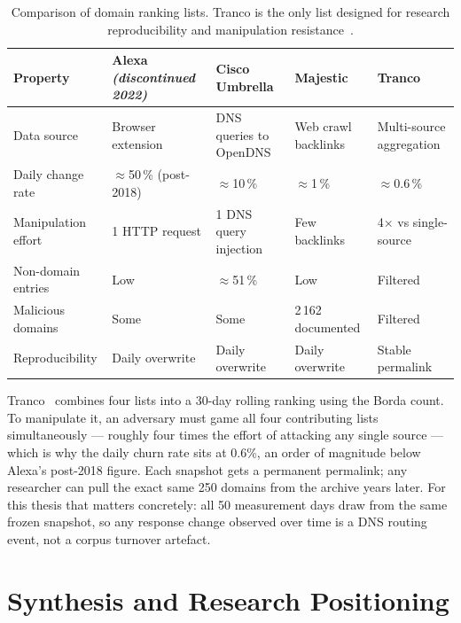 \begin{table}[tp]
\centering
\small
\begin{tabularx}{\linewidth}{p{2.2cm} X X X X}
\toprule
\textbf{Property} & \textbf{Alexa} \newline \textit{(discontinued 2022)} & \textbf{Cisco Umbrella} & \textbf{Majestic} & \textbf{Tranco} \\
\midrule
Data source  & Browser extension & \ac{DNS} queries to OpenDNS & Web crawl backlinks & Multi-source aggregation \\
Daily change rate & $\approx$50\,\% (post-2018) & $\approx$10\,\% & $\approx$1\,\% & $\approx$0.6\,\% \\
Manipulation effort & 1 \ac{HTTP} request & 1 \ac{DNS} query injection & Few backlinks & 4$\times$ vs single-source \\
Non-domain entries & Low & $\approx$51\,\% & Low & Filtered \\
Malicious domains & Some & Some & 2\,162 documented & Filtered \\
Reproducibility   & Daily overwrite & Daily overwrite & Daily overwrite & Stable permalink \\
\bottomrule
\end{tabularx}
\caption{Comparison of domain ranking lists. Tranco is the only list designed for research reproducibility and manipulation resistance~\cite{LePochat2019}.}
\label{tab:ranking_lists}
\end{table}

Tranco~\cite{LePochat2019} combines four lists into a 30-day rolling ranking using the Borda count. To manipulate it, an adversary must game all four contributing lists simultaneously --- roughly four times the effort of attacking any single source --- which is why the daily churn rate sits at 0.6\%, an order of magnitude below Alexa's post-2018 figure. Each snapshot gets a permanent permalink; any researcher can pull the exact same 250 domains from the archive years later. For this thesis that matters concretely: all 50 measurement days draw from the same frozen snapshot, so any response change observed over time is a \ac{DNS} routing event, not a corpus turnover artefact.

\section{Synthesis and Research Positioning}
\label{sec:2.7}

